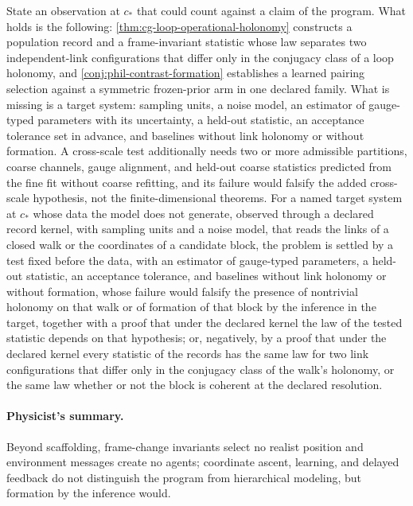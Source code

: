 State an observation at \(c_*\) that could count against a claim of the program.
What holds is the following: \cref{thm:cg-loop-operational-holonomy} constructs a
population record and a frame-invariant statistic whose law separates two
independent-link configurations that differ only in the conjugacy class of a
loop holonomy, and \cref{conj:phil-contrast-formation} establishes a learned
pairing selection against a symmetric frozen-prior arm in one declared
family. What is missing is a
target system: sampling units, a noise model, an estimator of gauge-typed
parameters with its uncertainty, a held-out statistic, an acceptance tolerance
set in advance, and baselines without link holonomy or without formation. A
cross-scale test additionally needs two or more admissible partitions,
coarse channels, gauge alignment, and held-out coarse statistics predicted from
the fine fit without coarse refitting, and its failure would falsify the added
cross-scale hypothesis, not the finite-dimensional theorems. For a named
target system at \(c_*\) whose data the model does not generate, observed
through a declared record kernel, with sampling units and a noise model, that
reads the links of a closed walk or the coordinates of a candidate block, the
problem is settled by a test fixed before the data, with an estimator of
gauge-typed parameters, a held-out statistic, an acceptance tolerance, and
baselines without link holonomy or without formation, whose failure would
falsify the presence of nontrivial holonomy on that walk or of formation of
that block by the inference in the target, together with a proof that under
the declared kernel the law of the tested statistic depends on that
hypothesis; or, negatively, by a proof that under the declared kernel every
statistic of the records has the same law for two link configurations that
differ only in the conjugacy class of the walk's holonomy, or the same law
whether or not the block is coherent at the declared resolution.

\paragraph{Physicist's summary.}
Beyond scaffolding, frame-change invariants select no realist position and
environment messages create no agents; coordinate ascent, learning, and delayed
feedback do not distinguish the program from hierarchical modeling, but
formation by the inference would.
